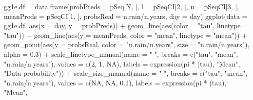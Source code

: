 \documentclass[
]{article}
\newenvironment{Shaded}{\begin{snugshade}}{\end{snugshade}}
\newcommand{\AttributeTok}[1]{\textcolor[rgb]{0.77,0.63,0.00}{#1}}
\newcommand{\ConstantTok}[1]{\textcolor[rgb]{0.00,0.00,0.00}{#1}}
\newcommand{\DecValTok}[1]{\textcolor[rgb]{0.00,0.00,0.81}{#1}}
\newcommand{\FloatTok}[1]{\textcolor[rgb]{0.00,0.00,0.81}{#1}}
\newcommand{\FunctionTok}[1]{\textcolor[rgb]{0.00,0.00,0.00}{#1}}
\newcommand{\NormalTok}[1]{#1}
\newcommand{\OtherTok}[1]{\textcolor[rgb]{0.56,0.35,0.01}{#1}}
\newcommand{\SpecialCharTok}[1]{\textcolor[rgb]{0.00,0.00,0.00}{#1}}
\newcommand{\StringTok}[1]{\textcolor[rgb]{0.31,0.60,0.02}{#1}}
\begin{document}
\begin{Shaded}
\begin{Highlighting}[]
\NormalTok{gg1e.df }\OtherTok{=} \FunctionTok{data.frame}\NormalTok{(}\AttributeTok{probPreds =}\NormalTok{ pSeq[N, ], }\AttributeTok{l =}\NormalTok{ pSeqCI[}\DecValTok{2}\NormalTok{, ], }\AttributeTok{u =}\NormalTok{ pSeqCI[}\DecValTok{3}\NormalTok{, ], }\AttributeTok{meanPreds =}\NormalTok{ pSeqCI[}\DecValTok{1}\NormalTok{,}
\NormalTok{    ], }\AttributeTok{probsReal =}\NormalTok{ n.rain}\SpecialCharTok{/}\NormalTok{n.years, }\AttributeTok{day =}\NormalTok{ day)}
\FunctionTok{ggplot}\NormalTok{(}\AttributeTok{data =}\NormalTok{ gg1e.df, }\FunctionTok{aes}\NormalTok{(}\AttributeTok{x =}\NormalTok{ day, }\AttributeTok{y =}\NormalTok{ probPreds)) }\SpecialCharTok{+} \FunctionTok{geom\_line}\NormalTok{(}\FunctionTok{aes}\NormalTok{(}\AttributeTok{color =} \StringTok{"tau"}\NormalTok{,}
    \AttributeTok{linetype =} \StringTok{"tau"}\NormalTok{)) }\SpecialCharTok{+} \FunctionTok{geom\_line}\NormalTok{(}\FunctionTok{aes}\NormalTok{(}\AttributeTok{y =}\NormalTok{ meanPreds, }\AttributeTok{color =} \StringTok{"mean"}\NormalTok{, }\AttributeTok{linetype =} \StringTok{"mean"}\NormalTok{)) }\SpecialCharTok{+}
    \FunctionTok{geom\_point}\NormalTok{(}\FunctionTok{aes}\NormalTok{(}\AttributeTok{y =}\NormalTok{ probsReal, }\AttributeTok{color =} \StringTok{"n.rain/n.years"}\NormalTok{, }\AttributeTok{size =} \StringTok{"n.rain/n.years"}\NormalTok{),}
        \AttributeTok{alpha =} \FloatTok{0.3}\NormalTok{) }\SpecialCharTok{+} \FunctionTok{scale\_linetype\_manual}\NormalTok{(}\AttributeTok{name =} \StringTok{" "}\NormalTok{, }\AttributeTok{breaks =} \FunctionTok{c}\NormalTok{(}\StringTok{"tau"}\NormalTok{, }\StringTok{"mean"}\NormalTok{,}
    \StringTok{"n.rain/n.years"}\NormalTok{), }\AttributeTok{values =} \FunctionTok{c}\NormalTok{(}\DecValTok{2}\NormalTok{, }\DecValTok{1}\NormalTok{, }\ConstantTok{NA}\NormalTok{), }\AttributeTok{labels =} \FunctionTok{expression}\NormalTok{(pi }\SpecialCharTok{*}\NormalTok{ (tau), }\StringTok{"Mean"}\NormalTok{,}
    \StringTok{"Data probability"}\NormalTok{)) }\SpecialCharTok{+} \FunctionTok{scale\_size\_manual}\NormalTok{(}\AttributeTok{name =} \StringTok{" "}\NormalTok{, }\AttributeTok{breaks =} \FunctionTok{c}\NormalTok{(}\StringTok{"tau"}\NormalTok{, }\StringTok{"mean"}\NormalTok{,}
    \StringTok{"n.rain/n.years"}\NormalTok{), }\AttributeTok{values =} \FunctionTok{c}\NormalTok{(}\ConstantTok{NA}\NormalTok{, }\ConstantTok{NA}\NormalTok{, }\FloatTok{0.1}\NormalTok{), }\AttributeTok{labels =} \FunctionTok{expression}\NormalTok{(pi }\SpecialCharTok{*}\NormalTok{ (tau), }\StringTok{"Mean"}\NormalTok{,}

\end{Highlighting}
\end{Shaded}
\end{document}
